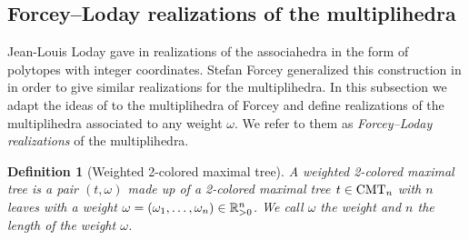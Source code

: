\documentclass[twoside, 11pt]{amsart}
\newtheorem{definition}{Definition}[section]
\theoremstyle{remark}
\begin{document}

\subsection{Forcey--Loday realizations of the multiplihedra}
Jean-Louis Loday gave in \cite{Loday04a} realizations of the associahedra in the form of polytopes with integer coordinates. 
Stefan Forcey generalized this construction in \cite{Forcey08} in order to give similar realizations for the multiplihedra. 
In this subsection we adapt the ideas of \cite{MTTV19} to the multiplihedra of Forcey and define realizations of the multiplihedra associated to any weight $\omega$. We refer to them as \emph{Forcey--Loday realizations} of the multiplihedra.

\begin{definition}[Weighted 2-colored maximal tree]
A \emph{weighted 2-colored maximal tree} is a pair $(t, \omega)$ made up of a 2-colored maximal tree $t\in \mathrm{CMT}_{n}$ with $n$ leaves with a weight $\omega= (\omega_1, \ldots, \omega_n) \in \mathbb{R}_{>0}^n$. 
We call $\omega$ the \emph{weight} and $n$ the \emph{length} of the weight $\omega$.
\end{definition}
\end{document}
